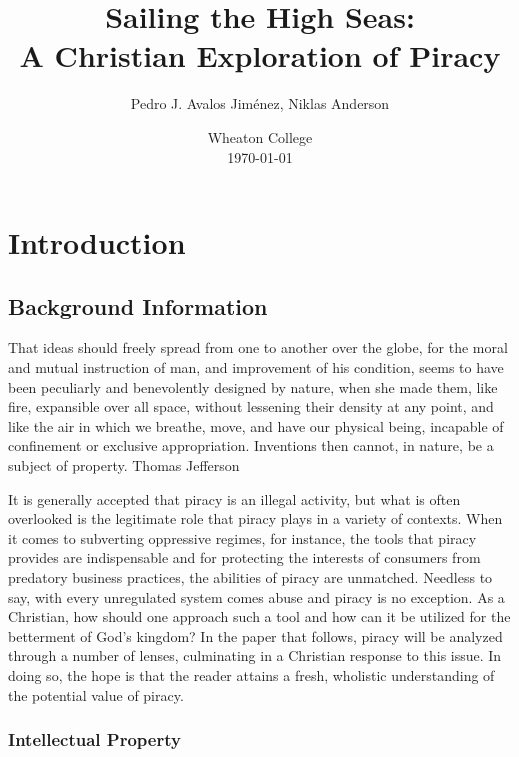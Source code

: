 \documentclass[onecolumn, 12pt]{article}
\title{Sailing the High Seas:\\ A Christian Exploration of Piracy}
\author{Pedro J. Avalos Jim\'enez, Niklas Anderson}
\date{Wheaton College\\\today}
\begin{document}
\maketitle

\section{Introduction}

\subsection{Background Information}

\begin{displayquote}
  \textins That ideas should freely spread from one to another over the globe, for the
    moral and mutual instruction of man, and improvement of his condition, seems to have been
    peculiarly and benevolently designed by nature, when she made them, like fire, expansible
    over all space, without lessening their density at any point, and like the air in which we
    breathe, move, and have our physical being, incapable of confinement or exclusive
    appropriation. Inventions then cannot, in nature, be a subject of property.  Thomas
    Jefferson ~\cite{barlow:wine}
\end{displayquote}
It is generally accepted that piracy is an illegal activity, but what is often overlooked
is the legitimate role that piracy plays in a variety of contexts. When it comes to
subverting oppressive regimes, for instance, the tools that piracy provides are
indispensable and for protecting the interests of consumers from predatory business
practices, the abilities of piracy are unmatched. Needless to say, with every unregulated
system comes abuse and piracy is no exception. As a Christian, how should one approach
such a tool and how can it be utilized for the betterment of God's kingdom? In the paper
that follows, piracy will be analyzed through a number of lenses, culminating in a
Christian response to this issue. In doing so, the hope is that the reader attains a
fresh, wholistic understanding of the potential value of piracy.

\subsubsection{Intellectual Property}
\end{document}
